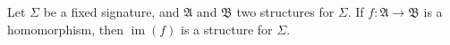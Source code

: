 \documentclass[12pt]{article}
\newcommand{\A}{\mathfrak{A}}
\newcommand{\B}{\mathfrak{B}}
\DeclareMathOperator{\im}{im}
\begin{document}
Let $\Sigma$ be a fixed signature, and $\A$ and $\B$ two structures for $\Sigma$. If $f : \A \to \B$ is a homomorphism, then $\im(f)$ is a structure for $\Sigma$.
\end{document}
